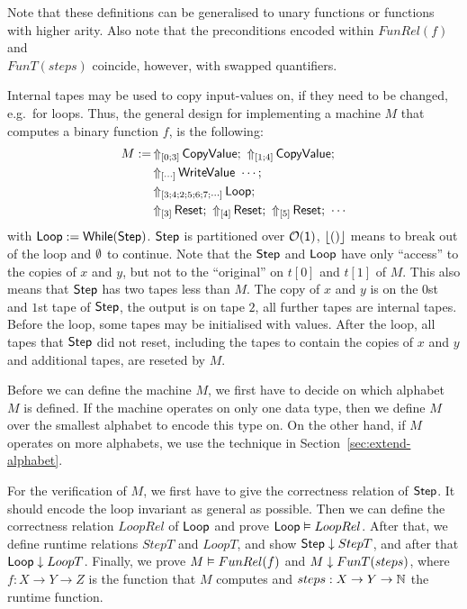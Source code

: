 Note that these definitions can be generalised to unary functions or functions with higher arity.  Also note that the preconditions encoded within
$FunRel(f)$ and \\
$FunT(steps)$ coincide, however, with swapped quantifiers.

Internal tapes may be used to copy input-values on, if they need to be changed, e.g.\ for loops.  Thus, the general design for implementing a machine
$M$ that computes a binary function $f$, is the following:
\begin{align*}
  M := & \LiftTapes{\MS{CopyValue}}{\Vector{0; 3}} \Seq \LiftTapes{\MS{CopyValue}}{\Vector{1; 4}} \Seq \\
       & \LiftTapes{\MS{WriteValue}~\cdots}{\Vector{\cdots}} \Seq \\
       & \LiftTapes{\MS{Loop}}{\Vector{3; 4; 2; 5; 6; 7; \cdots}} \Seq \\
       & \LiftTapes{\MS{Reset}}{\Vector{3}} \Seq \LiftTapes{\MS{Reset}}{\Vector{4}} \Seq \LiftTapes{\MS{Reset}}{\Vector{5}} \Seq \cdots
\end{align*}
with $\mathsf{Loop} := \mathsf{While}(\mathsf{Step})$.  $\mathsf{Step}$ is partitioned over $\mathcal{O}(\mathsf{1})$, $\left\lfloor {\ensuremath{\mathsf{()}}} \right\rfloor$ means to break out of the loop and $\emptyset$ to
continue.  Note that the $\mathsf{Step}$ and $\mathsf{Loop}$ have only ``access'' to the copies of $x$ and $y$, but not to the ``original'' on $t[0]$ and
$t[1]$ of $M$.  This also means that $\mathsf{Step}$ has two tapes less than $M$.  The copy of $x$ and $y$ is on the $0$st and $1$st tape of $\mathsf{Step}$,
the output is on tape $2$, all further tapes are internal tapes.  Before the loop, some tapes may be initialised with values.  After the loop, all
tapes that $\mathsf{Step}$ did not reset, including the tapes to contain the copies of $x$ and $y$ and additional tapes, are reseted by $M$.

Before we can define the machine $M$, we first have to decide on which alphabet $M$ is defined.  If the machine operates on only one data type, then
we define $M$ over the smallest alphabet to encode this type on.  On the other hand, if $M$ operates on more alphabets, we use the technique in
Section~\ref{sec:extend-alphabet}.

For the verification of $M$, we first have to give the correctness relation of $\mathsf{Step}$.  It should encode the loop invariant as general as
possible.  Then we can define the correctness relation $LoopRel$ of $\mathsf{Loop}$ and prove $\mathsf{Loop} \mathrel{\vDash} LoopRel$.  After that, we define runtime
relations $StepT$ and $LoopT$, and show $\mathsf{Step} \mathrel{\downarrow} StepT$, and after that $\mathsf{Loop} \mathrel{\downarrow} LoopT$.  Finally, we prove
$M \mathrel{\vDash} FunRel(f)$ and $M \mathrel{\downarrow} FunT(steps)$, where $f:X \to Y \to Z$ is the function that $M$ computes and $steps:X \rightarrow Y \rightarrow \mathbb{N}$ the
runtime function.


